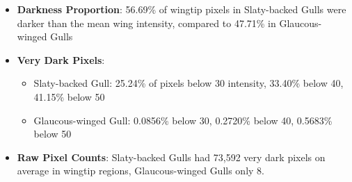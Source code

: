 \documentclass[a4paper,12pt]{report}
\begin{document}
\begin{itemize}
    \item \textbf{Darkness Proportion}: 56.69\% of wingtip pixels in Slaty-backed Gulls were darker than the mean wing intensity, compared to 47.71\% in Glaucous-winged Gulls
    \item \textbf{Very Dark Pixels}:
    \begin{itemize}
        \item Slaty-backed Gull: 25.24\% of pixels below 30 intensity, 33.40\% below 40, 41.15\% below 50
        \item Glaucous-winged Gull: 0.0856\% below 30, 0.2720\% below 40, 0.5683\% below 50
    \end{itemize}
    \item \textbf{Raw Pixel Counts}: Slaty-backed Gulls had 73,592 very dark pixels on average in wingtip regions, Glaucous-winged Gulls only 8.
\end{itemize}
\end{document}
